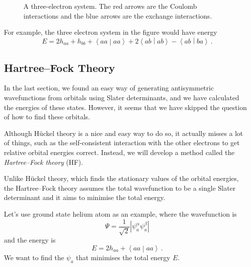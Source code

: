 \documentclass{article}
\theoremstyle{plain}\theoremheaderfont{\normalfont\itshape}\theorembodyfont{\rmfamily}\theoremseparator{.}\newtheorem*{rem}{Remark}\newtheorem*{ex}{Example}\newtheorem*{proof}{Proof}\newtheorem*{altp}{Alternative proof}
\theoremstyle{plain}\theoremheaderfont{\normalfont\bfseries}\theorembodyfont{\rmfamily}\theoremseparator{.}\newtheorem{thm}{Theorem}[section]\newtheorem{lem}[thm]{Lemma}\newtheorem{prop}[thm]{Proposition}\newtheorem*{cor}{Corollary}\newtheorem{defn}[thm]{Definition}\newtheorem{clm}[thm]{Claim}\newtheorem{clminproof}{Claim}\newtheorem{pos}{Postulate}[section]
\theoremstyle{break}\theoremheaderfont{\normalfont\itshape}\theorembodyfont{\rmfamily}\theoremseparator{.\medskip}\newtheorem*{proofskip}{Proof}\newtheorem*{exs}{Examples}\newtheorem*{rems}{Remarks}
\theoremstyle{break}\theoremheaderfont{\normalfont\bfseries}\theorembodyfont{\rmfamily}\theoremseparator{.\medskip}\newtheorem{lemskip}[thm]{Lemma}\newtheorem{defnskip}[thm]{Definition}\newtheorem{propskip}[thm]{Proposition}\newtheorem{thmskip}[thm]{Theorem}
\numberwithin{equation}{section}
\newcommand{\braket}[2]{\left\langle #1 \middle| #2 \right\rangle}
\newcommand{\abs}[1]{\left| #1 \right|}
\begin{document}
    \begin{figure}[ht!]
        \centering
        \caption{A three-electron system. The red arrows are the Coulomb interactions and the blue arrows are the exchange interactions.}
    \end{figure}

    For example, the three electron system in the figure would have energy
    \begin{equation}
        E=2h_{aa}+h_{bb}+\braket{aa}{aa}+2\braket{ab}{ab}-\braket{ab}{ba}\,.
    \end{equation}

    \subsection{Hartree--Fock Theory}
    In the last section, we found an easy way of generating antisymmetric wavefunctions from orbitals using Slater determinants, and we have calculated the energies of these states. However, it seems that we have skipped the question of how to find these orbitals.

    Although H\"{u}ckel theory is a nice and easy way to do so, it actually misses a lot of things, such as the self-consistent interaction with the other electrons to get relative orbital energies correct. Instead, we will develop a method called the \textit{Hartree--Fock theory} (HF).

    Unlike H\"{u}ckel theory, which finds the stationary values of the orbital energies, the Hartree--Fock theory assumes the total wavefunction to be a single Slater determinant and it aims to minimise the total energy.

    Let's use ground state helium atom as an example, where the wavefunction is
    \begin{equation}
        \Psi=\frac{1}{\sqrt{2}}\abs{\psi_a^\alpha\psi_a^\beta}
    \end{equation}
    and the energy is
    \begin{equation}
        E=2h_{aa}+\braket{aa}{aa}\,.
    \end{equation}
    We want to find the \(\psi_a\) that minimises the total energy \(E\).    
    
\end{document}
